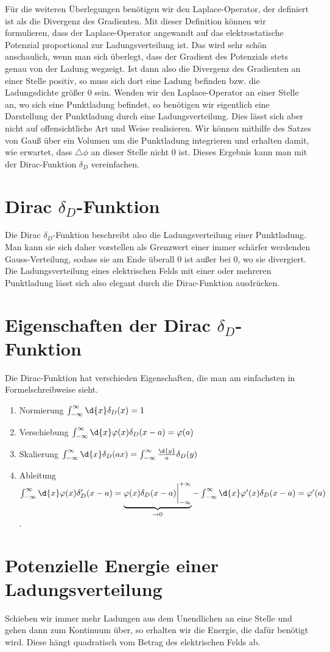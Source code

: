 \documentclass{../../theo-lecture/lecture}
\begin{document}
    Für die weiteren Überlegungen benötigen wir den Laplace-Operator, der definiert ist als die Divergenz des Gradienten. Mit dieser Definition können wir formulieren, dass der Laplace-Operator angewandt auf das elektrostatische Potenzial proportional zur Ladungsverteilung ist. Das wird sehr schön anschaulich, wenn man sich überlegt, dass der Gradient des Potenzials stets genau von der Ladung wegzeigt. Ist dann also die Divergenz des Gradienten an einer Stelle positiv, so muss sich dort eine Ladung befinden bzw. die Ladungsdichte größer 0 sein. Wenden wir den Laplace-Operator an einer Stelle an, wo sich eine Punktladung befindet, so benötigen wir eigentlich eine Darstellung der Punktladung durch eine Ladungsverteilung. Dies lässt sich aber nicht auf offensichtliche Art und Weise realisieren. Wir können mithilfe des Satzes von Gauß über ein Volumen um die Punktladung integrieren und erhalten damit, wie erwartet, dass $\triangle \phi$ an dieser Stelle nicht 0 ist. Dieses Ergebnis kann man mit der Dirac-Funktion $\delta_D$ vereinfachen.
    \section{Dirac $\delta_D$-Funktion}
    Die Dirac $\delta_D$-Funktion beschreibt also die Ladungsverteilung einer Punktladung. Man kann sie sich daher vorstellen als Grenzwert einer immer schärfer werdenden Gauss-Verteilung, sodass sie am Ende überall 0 ist außer bei 0, wo sie divergiert.
    Die Ladungsverteilung eines elektrischen Felds mit einer oder mehreren Punktladung lässt sich also elegant durch die Dirac-Funktion ausdrücken.
    \section{Eigenschaften der Dirac $\delta_D$-Funktion}
    Die Dirac-Funktion hat verschieden Eigenschaften, die man am einfachsten in Formelschreibweise sieht.
    \begin{enumerate}
        \item Normierung $\int_{-\infty}^\infty\d{x} \delta_D(x) = 1$
        \item Verschiebung $\int_{-\infty}^\infty\d{x}\varphi(x) \delta_D(x-a) = \varphi(a)$
        \item Skalierung $\int_{-\infty}^\infty\d{x} \delta_D(ax) = \int_{-\infty}^\infty \frac{\d{y}}{a}\delta_D(y)$
        \item Ableitung $\int_{-\infty}^\infty \d{x} \varphi(x) \delta_D'(x-a) = \underbrace{\varphi(x) \delta_D(x-a)\bigg|_{-\infty}^{+\infty}}_{\to 0} - \int_{-\infty}^\infty\d{x} \varphi'(x)\delta_D(x-a) = \varphi'(a)$.
    \end{enumerate}
    \section{Potenzielle Energie einer Ladungsverteilung}
    Schieben wir immer mehr Ladungen aus dem Unendlichen an eine Stelle und gehen dann zum Kontinuum über, so erhalten wir die Energie, die dafür benötigt wird. Diese hängt quadratisch vom Betrag des elektrischen Felds ab.
\end{document}
